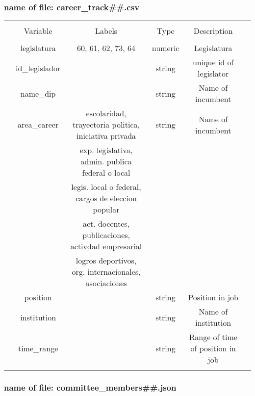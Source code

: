 \documentclass{article}
\begin{document}
\newpage
\subsubsection*{name of file: career\_track\#\#.csv} 

\begin{table}[!htbp] \centering 
	
	\begin{tabular}{@{\extracolsep{5pt}} cccccc} 
		\\[-1.8ex]\hline 
		\hline \\[-1.8ex] 
		& Variable & Labels  & Type & Description \\ 
		\hline \\[-1.8ex] 
		& legislatura  &60, 61, 62, 73, 64 & numeric  & Legislatura   \\ 
		& id\_legislador  &   & string  & unique id of legislator   \\ 
		& name\_dip  &   & string  & Name of incumbent  \\ 
		& area\_career & 	escolaridad, trayectoria politica, iniciativa privada & string  & Name of incumbent  \\ 
		& & exp. legislativa, admin. publica federal o local  &   &   \\ 
		& & legis. local o federal, cargos de eleccion popular   &   &   \\ 
		& &  act. docentes, publicaciones, activdad empresarial  &   &   \\ 
		& &  logros deportivos, org. internacionales, asociaciones  &   &   \\ 
		& position  &   & string  & Position in job  \\ 
		& institution  &   & string  &  Name of institution  \\ 
		& time\_range &   & string  &  Range of time of position in job \\ 
		
		\hline \\[-1.8ex] 
	\end{tabular} 
\end{table} 


\subsubsection*{name of file: committee\_members\#\#.json}
\end{document}
